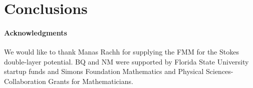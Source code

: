 \documentclass[preprint, 10pt]{elsarticle}
\begin{document}
\section{Conclusions}
\label{s:conclusions}


\paragraph{\bf Acknowledgments} We would like to thank Manas Rachh for
supplying the FMM for the Stokes double-layer potential. BQ and NM were
supported by Florida State University startup funds and Simons
Foundation Mathematics and Physical Sciences-Collaboration Grants for
Mathematicians.

 

\end{document}
